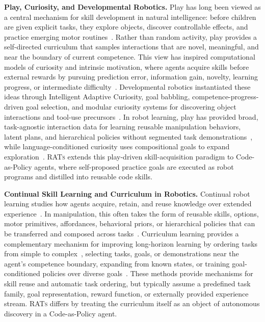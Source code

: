 \documentclass{llmxive}
\begin{document}
\textbf{Play, Curiosity, and Developmental Robotics.}
Play has long been viewed as a central mechanism for skill development in natural intelligence: before children are given explicit tasks, they explore objects, discover controllable effects, and practice emerging motor routines~\citep{piaget1952origins, vygotsky1978mind, pellegrini2009role, gopnik2020childhood}. Rather than random activity, play provides a self-directed curriculum that samples interactions that are novel, meaningful, and near the boundary of current competence. This view has inspired computational models of curiosity and intrinsic motivation, where agents acquire skills before external rewards by pursuing prediction error, information gain, novelty, learning progress, or intermediate difficulty~\citep{schmidhuber1991curious, schmidhuber2010formal, houthooft2016vime, oudeyer2007intrinsic, kaplan2007intrinsic, kidd2012goldilocks}. Developmental robotics instantiated these ideas through Intelligent Adaptive Curiosity, goal babbling, competence-progress-driven goal selection, and modular curiosity systems for discovering object interactions and tool-use precursors~\citep{rolf2010goal, baranes2013active, forestier2016modular, forestier2017intrinsically}. In robot learning, play has provided broad, task-agnostic interaction data for learning reusable manipulation behaviors, latent plans, and hierarchical policies without segmented task demonstrations~\citep{lynch2020learning, wang2023mimicplay}, while language-conditioned curiosity uses compositional goals to expand exploration~\citep{colas2020language}. \textsc{RATs} extends this play-driven skill-acquisition paradigm to Code-as-Policy agents, where self-proposed practice goals are executed as robot programs and distilled into reusable code skills.

\textbf{Continual Skill Learning and Curriculum in Robotics.}
Continual robot learning studies how agents acquire, retain, and reuse knowledge over extended experience~\citep{thrun1995lifelong, parisi2019continual, lesort2020continual}. In manipulation, this often takes the form of reusable skills, options, motor primitives, affordances, behavioral priors, or hierarchical policies that can be transferred and composed across tasks~\citep{sutton1999between, konidaris2012robot, kroemer2021review, pertsch2020long, lynch2021language, wan2024lotuscontinualimitationlearning, ma2024dreureka}. Curriculum learning provides a complementary mechanism for improving long-horizon learning by ordering tasks from simple to complex~\citep{bengio2009curriculum, narvekar2020curriculum}, selecting tasks, goals, or demonstrations near the agent's competence boundary, expanding from known states, or training goal-conditioned policies over diverse goals~\citep{florensa2018automatic, nair2018visual, pong2020skewfit, colas2020language, seita2019zpd}. These methods provide mechanisms for skill reuse and automatic task ordering, but typically assume a predefined task family, goal representation, reward function, or externally provided experience stream. \textsc{RATs} differs by treating the curriculum itself as an object of autonomous discovery in a Code-as-Policy agent.
\end{document}
